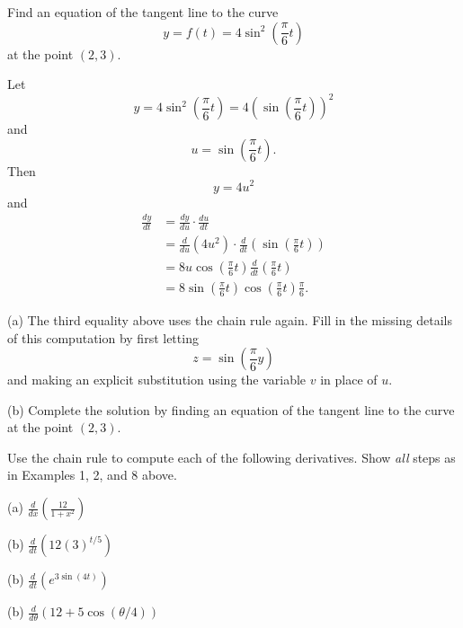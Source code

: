 \documentclass{ximera}
\begin{document}
\begin{example}  \label{Ex:df4thghg}
Find an equation of the tangent line to the curve
\[
  y = f(t) = 4 \sin^2 \left( \frac{\pi}{6}t \right)
\]
at the point $(2,3)$.

\begin{explanation}
Let 
\[
       y = 4 \sin^2 \left( \frac{\pi}{6}t \right) =  4 \left( \sin \left( \frac{\pi}{6}t \right)\right)^2
\]
and 
\[
      u = \sin\left( \frac{\pi}{6}t \right) .
\]
Then
\[
     y =4 u^2
\]
and
\begin{align*}
\frac{dy}{dt} &= \frac{dy}{du} \cdot \frac{du}{dt}  \\
                     &= \frac{d}{du} \left( 4u^2 \right)  \cdot \frac{d}{dt}\left(  \sin\left( \frac{\pi}{6}t \right)  \right)  \\
                     &= 8u   \cos \left(   \frac{\pi}{6}t  \right) \frac{d}{dt} \left( \frac{\pi}{6}t  \right)     \\
                     &= 8\sin\left( \frac{\pi}{6}t \right)  \cos \left(   \frac{\pi}{6}t  \right) \frac{\pi}{6} .
\end{align*}

\begin{question}  \label{Q:dsf4tt}
(a) The third equality above uses the chain rule again. Fill in the missing details of this computation by first letting
\[
    z = \sin \left(  \frac{\pi}{6}y \right)
\]
and making an explicit substitution using the variable $v$ in place of $u$.

(b) Complete the solution by finding an equation of the tangent line to the curve at the point $(2,3)$. 
\end{question}
\end{explanation}
\end{example}


\begin{question} \label{Q:ds99fgg0sdf}
Use the chain rule to compute each of the following derivatives. Show \emph{all} steps as in Examples 1, 2, and 8 above.

(a) $\frac{d}{dx} \left(  \frac{12}{1+x^2} \right)$

(b) $\frac{d}{dt} \left( 12 (3)^{t/5}   \right)$

(b) $\frac{d}{dt} \left(  e^{3 \sin (4t)} \right)$

(b) $\frac{d}{d\theta} \left( 12 + 5 \cos (\theta/4)   \right)$

\end{question}
\end{document}
